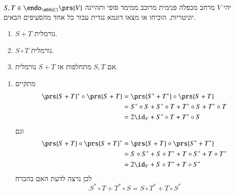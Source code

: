 \documentclass[a4paper,10pt,oneside,openany]{article}
\begin{document}
\begin{exercise}%
יהי
$V$
מרחב מכפלה פנימית מרוכב ממימד סופי ותהיינה
$S,T \in \endo_{\mbb{C}}\prs{V}$
יוניטריות.
הוכיחו או מצאו דוגמא נגדית עבור כל אחד מהסעיפים הבאים.

\begin{enumerate}
\item $S+T$
נורמלית.
\item $S \circ T$
נורמלית.
\item אם
$S,T$
מתחלפות אז
$S+T$
נורמלית.
\end{enumerate}
\end{exercise}

\begin{solution}
\begin{enumerate}
\item מתקיים
\begin{align*}
\prs{S+T}^* \circ \prs{S+T} &= \prs{S^* + T^*} \circ \prs{S+T}
\\&=
S^* \circ S + S^* \circ T + T^* \circ S + T^* \circ T
\\&=
2 \id_V + S^* \circ T + T^* \circ S
\end{align*}
וגם
\begin{align*}
\prs{S+T} \circ \prs{S+T}^* &= \prs{S + T} \circ \prs{S^* + T^*}
\\&= S \circ S^* + S \circ T^* + T \circ S^* + T \circ T^*
\\ \hphantom{\prs{S+T} \circ \prs{S+T}^*} &= 2\id_V + S \circ T^* + T \circ S^*
\end{align*}
לכן נרצה לדעת האם בהכרח
\[\text{.} S^* \circ T + T^* \circ S = S \circ T^* + T \circ S^*\]


\end{enumerate}
\end{solution}
\end{document}
